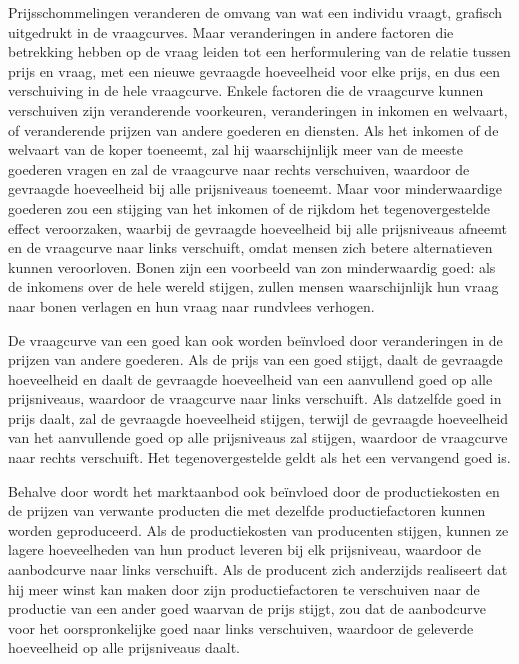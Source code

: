 Prijsschommelingen veranderen de omvang van wat een individu vraagt, grafisch uitgedrukt in de vraagcurves. Maar veranderingen in andere factoren die betrekking hebben op de vraag leiden tot een herformulering van de relatie tussen prijs en vraag, met een nieuwe gevraagde hoeveelheid voor elke prijs, en dus een verschuiving in de hele vraagcurve. Enkele factoren die de vraagcurve kunnen verschuiven zijn veranderende voorkeuren, veranderingen in inkomen en welvaart, of veranderende prijzen van andere goederen en diensten. Als het inkomen of de welvaart van de koper toeneemt, zal hij waarschijnlijk meer van de meeste goederen vragen en zal de vraagcurve naar rechts verschuiven, waardoor de gevraagde hoeveelheid bij alle prijsniveaus toeneemt. Maar voor minderwaardige goederen zou een stijging van het inkomen of de rijkdom het tegenovergestelde effect veroorzaken, waarbij de gevraagde hoeveelheid bij alle prijsniveaus afneemt en de vraagcurve naar links verschuift, omdat mensen zich betere alternatieven kunnen veroorloven. Bonen zijn een voorbeeld van zo\textquotesingle n minderwaardig goed: als de inkomens over de hele wereld stijgen, zullen mensen waarschijnlijk hun vraag naar bonen verlagen en hun vraag naar rundvlees verhogen.

De vraagcurve van een goed kan ook worden beïnvloed door veranderingen in de prijzen van andere goederen. Als de prijs van een goed stijgt, daalt de gevraagde hoeveelheid en daalt de gevraagde hoeveelheid van een aanvullend goed op alle prijsniveaus, waardoor de vraagcurve naar links verschuift. Als datzelfde goed in prijs daalt, zal de gevraagde hoeveelheid stijgen, terwijl de gevraagde hoeveelheid van het aanvullende goed op alle prijsniveaus zal stijgen, waardoor de vraagcurve naar rechts verschuift. Het tegenovergestelde geldt als het een vervangend goed is.

Behalve door wordt het marktaanbod ook beïnvloed door de productiekosten en de prijzen van verwante producten die met dezelfde productiefactoren kunnen worden geproduceerd. Als de productiekosten van producenten stijgen, kunnen ze lagere hoeveelheden van hun product leveren bij elk prijsniveau, waardoor de aanbodcurve naar links verschuift. Als de producent zich anderzijds realiseert dat hij meer winst kan maken door zijn productiefactoren te verschuiven naar de productie van een ander goed waarvan de prijs stijgt, zou dat de aanbodcurve voor het oorspronkelijke goed naar links verschuiven, waardoor de geleverde hoeveelheid op alle prijsniveaus daalt.

